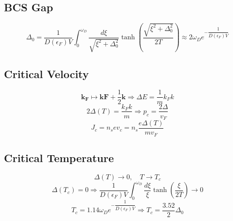 \documentclass[12pt]{extarticle}
\newcommand{\parentheses}[1]{\ensuremath{\left( #1 \right)}}
\begin{document}
\begin{multicols*}{2}
\subsection{BCS Gap}
$$\Delta_0= \dfrac{1}{D(\epsilon_F)V} \int_0^{\omega_D} \dfrac{d \xi}{\sqrt{\xi^2 + \Delta^2_0}} \tanh \parentheses{\dfrac{\sqrt{\xi^2 + \Delta^2_0}}{2T}} \approx 2 \omega_D e^{-\dfrac{1}{D(\epsilon_F)V}}$$

\subsection{Critical Velocity}
$$\mathbf{k_F} \mapsto \mathbf{kF}+\dfrac{1}{2}\mathbf{k} \Rightarrow \Delta E = \dfrac{1}{m}k_F k$$
$$2 \Delta (T) = \dfrac{k_F k}{m} \Rightarrow p_c = \dfrac{2 \Delta}{v_F}$$
$$J_c=n_s e v_c = n_s \dfrac{e \Delta (T)}{m v_F }$$

\subsection{Critical Temperature}
$$\Delta(T) \rightarrow 0, \quad T \rightarrow T_c$$
$$\Delta(T_c)=0 \Rightarrow \dfrac{1}{D(\epsilon_F)V} \int_0^{\omega_D} \dfrac{d \xi}{\xi} \tanh \parentheses{\dfrac{\xi}{2T}} \rightarrow 0$$
$$T_c = 1.14 \omega_D e^{-\dfrac{1}{D(\epsilon_F)V}} \Rightarrow T_c = \dfrac{3.52}{2} \Delta_0$$

\end{multicols*}
\end{document}
